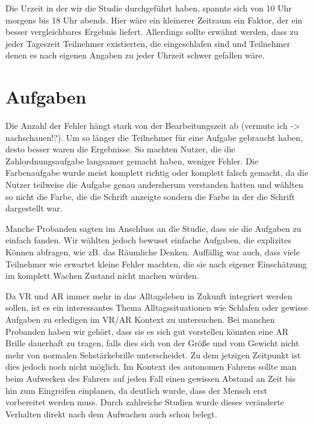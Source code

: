 Die Urzeit in der wir die Studie durchgeführt haben, spannte sich von 10 Uhr morgens bis 18 Uhr abends. Hier wäre ein kleinerer Zeitraum ein Faktor, der ein besser vergleichbares Ergebnis liefert. 
Allerdings sollte erwähnt werden, dass zu jeder Tageszeit Teilnehmer existierten, die eingeschlafen sind und Teilnehmer denen es nach eigenen Angaben zu jeder Uhrzeit schwer gefallen wäre.

\section{Aufgaben}

Die Anzahl der Fehler hängt stark von der Bearbeitungszeit ab (vermute ich -> nachschauen!?). Um so länger die Teilnehmer für eine Aufgabe gebraucht haben, desto besser waren die Ergebnisse. So machten Nutzer, die die Zahlordnungsaufgabe langsamer gemacht haben, weniger Fehler. Die Farbenaufgabe wurde meist komplett richtig oder komplett falsch gemacht, da die Nutzer teilweise die Aufgabe genau andersherum verstanden hatten und wählten so nicht die Farbe, die die Schrift anzeigte sondern die Farbe in der die Schrift dargestellt war.

Manche Probanden sagten im Anschluss an die Studie, dass sie die Aufgaben zu einfach fanden. Wir wählten jedoch bewusst einfache Aufgaben, die explizites Können abfragen, wie zB. das Räumliche Denken. Auffällig war auch, dass viele Teilnehmer wie erwartet kleine Fehler machten, die sie nach eigener Einschätzung im komplett Wachen Zustand nicht machen würden. 



Da VR und AR immer mehr in das Alltagsleben in Zukunft integriert werden sollen, ist es ein interessantes Thema Alltagssituationen wie Schlafen oder gewisse Aufgaben zu erledigen im VR/AR Kontext zu untersuchen. Bei manchen Probanden haben wir gehört, dass sie es sich gut vorstellen könnten eine AR Brille dauerhaft zu tragen, falls dies sich von der Größe und vom Gewicht nicht mehr von normalen Sehstärkebrille unterscheidet. Zu dem jetzigen Zeitpunkt ist dies jedoch noch nicht möglich.
Im Kontext des autonomen Fahrens sollte man beim Aufwecken des Fahrers auf jeden Fall einen gewissen Abstand an Zeit bis hin zum Eingreifen einplanen, da deutlich wurde, dass der Mensch erst vorbereitet werden muss. Durch zahlreiche Studien wurde dieses veränderte Verhalten direkt nach dem Aufwachen auch schon belegt.

